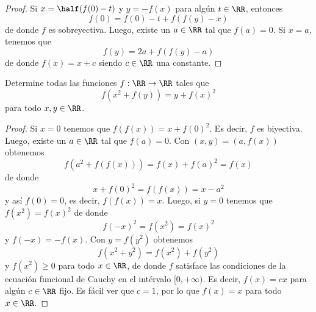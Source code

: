 \begin{proof}
	Si $x=\half(f(0)-t)$ y $y=-f(x)$ para algún $t\in\RR$, entonces
	\[f(0)=f(0)-t+f(f(y)-x)\]
	de donde $f$ es sobreyectiva. Luego, existe un $a\in\RR$ tal que $f(a)=0$. Si $x=a$, tenemos que
	\[f(y)=2a+f(f(y)-a)\]
	de donde $f(x)=x+c$ siendo $c\in\RR$ una constante.
\end{proof}

\begin{probEG}
	Determine todas las funciones $f:\RR\to\RR$ tales que
	\[f(x^2+f(y))=y+f(x)^2\]
	para todo $x,y\in\RR$.
\end{probEG}

\begin{proof}
	Si $x=0$ tenemos que $f(f(x))=x+f(0)^2$. Es decir, $f$ es biyectiva. Luego, existe un $a\in\RR$ tal que $f(a)=0$. Con $(x,y)=(a,f(x))$ obtenemos
	\[f(a^2+f(f(x)))=f(x)+f(a)^2=f(x)\]
	de donde
	\[x+f(0)^2=f(f(x))=x-a^2\]
	y así $f(0)=0$, es decir, $f(f(x))=x$. Luego, si $y=0$ tenemos que $f(x^2)=f(x)^2$ de donde
	\[f(-x)^2=f(x^2)=f(x)^2\]
	y $f(-x)=-f(x)$. Con $y=f(y^2)$ obtenemos
	\[f(x^2+y^2)=f(x^2)+f(y^2)\]
	y $f(x^2)\ge 0$ para todo $x\in\RR$, de donde $f$ satisface las condiciones de la ecuación funcional de Cauchy en el intérvalo $[0,+\infty)$. Es decir, $f(x)=cx$ para algún $c\in\RR$ fijo. Es fácil ver que $c=1$, por lo que $f(x)=x$ para todo $x\in\RR$.
\end{proof}



